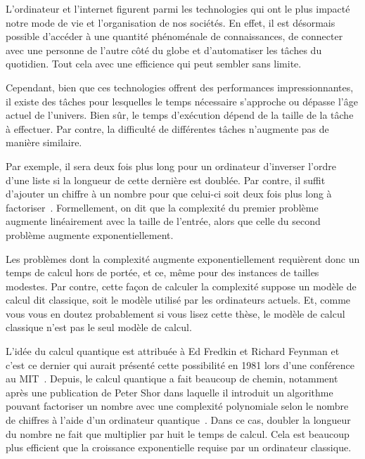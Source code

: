 \begin{comment}
\end{comment}

\Introduction   %

L'ordinateur et l'internet figurent parmi les technologies qui ont le plus impacté
notre mode de vie et l'organisation de nos sociétés.
En effet,
il est désormais possible d'accéder à une quantité phénoménale de connaissances,
de connecter avec une personne de l'autre côté du globe
et d'automatiser les tâches du quotidien.
Tout cela avec une efficience qui peut sembler sans limite.

Cependant, 
bien que ces technologies offrent des performances impressionnantes,
il existe des tâches pour lesquelles le temps nécessaire s'approche ou
dépasse l'âge actuel de l'univers.
Bien sûr,
le temps d'exécution dépend de la taille de la tâche à effectuer.
Par contre, 
la difficulté de différentes tâches n'augmente pas de manière similaire.

Par exemple,
il sera deux fois plus long pour un ordinateur d'inverser l'ordre d'une liste 
si la longueur de cette dernière est doublée.
Par contre,
il suffit d'ajouter un chiffre à un nombre pour que celui-ci soit deux 
fois plus long à factoriser~\cite{arora_computational_2009}.
Formellement,
on dit que la complexité du premier problème augmente linéairement avec la taille de l'entrée,
alors que celle du second problème augmente exponentiellement.

Les problèmes dont la complexité augmente exponentiellement requièrent donc un temps de calcul
hors de portée, et ce, même pour des instances de tailles modestes.
Par contre,
cette façon de calculer la complexité suppose un modèle de calcul dit classique,
soit le modèle utilisé par les ordinateurs actuels.
Et,
comme vous vous en doutez probablement si vous lisez cette thèse,
le modèle de calcul classique n'est pas le seul modèle de calcul.

L'idée du calcul quantique est attribuée à Ed Fredkin et Richard Feynman et 
c'est ce dernier qui aurait présenté cette possibilité en 1981 lors d'une conférence au MIT~\cite{hoofnagle_birth_2021}.
Depuis,
le calcul quantique a fait beaucoup de chemin,
notamment après une publication de Peter Shor dans laquelle il introduit un 
algorithme pouvant factoriser un nombre avec une complexité polynomiale selon
le nombre de chiffres à l'aide d'un ordinateur quantique~\cite{shor_algorithms_1994}.
Dans ce cas,
doubler la longueur du nombre ne fait que multiplier par huit le temps de calcul.
Cela est beaucoup plus efficient que la croissance exponentielle requise par un ordinateur classique.

